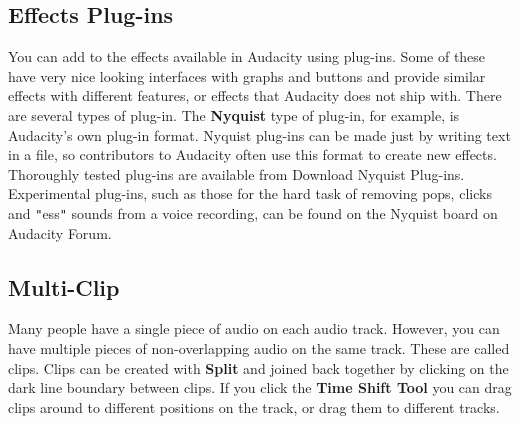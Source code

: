 \documentclass[twocolumn]{book}
\begin{document}
\subsection{Effects Plug-ins}


You can add to the effects available in Audacity using plug-ins.  Some of these have very nice looking interfaces with graphs and buttons and provide similar effects with different features, or effects that Audacity does not ship with. There are several types of plug-in. The \textbf{Nyquist} type of plug-in, for example, is Audacity's own plug-in format. Nyquist plug-ins can be made just by writing text in a file, so contributors to Audacity often use this format to create new effects. Thoroughly tested plug-ins are available from Download Nyquist Plug-ins. Experimental plug-ins, such as those for the hard task of removing pops, clicks and \texttt{{}"{}}ess\texttt{{}"{}} sounds from a voice recording, can be found on the Nyquist board on Audacity Forum.

\subsection{Multi-Clip}


Many people have a single piece of audio on each audio track.  However, you can have multiple pieces of non-overlapping audio on the same track.  These are called clips.  Clips can be created with \textbf{Split} and joined back together by clicking on the dark line boundary between clips. If you click the \textbf{Time Shift Tool} you can drag clips around to different positions on the track, or drag them to different tracks.%
% 
%  
% 
%  

											

\iffalse


\fi
\end{document}
